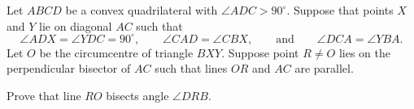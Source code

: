Let $ABCD$ be a convex quadrilateral with $\angle ADC>90^\circ$. Suppose that points $X$ and $Y$ lie on diagonal $AC$ such that
\[
\angle ADX=\angle YDC=90^\circ,\qquad
\angle CAD=\angle CBX,\qquad\text{and}\qquad
\angle DCA=\angle YBA.
\]
Let $O$ be the circumcentre of triangle $BXY$. Suppose point $R\neq O$ lies on the perpendicular bisector of $AC$ such that lines $OR$ and $AC$ are parallel.

Prove that line $RO$ bisects angle $\angle DRB$.
